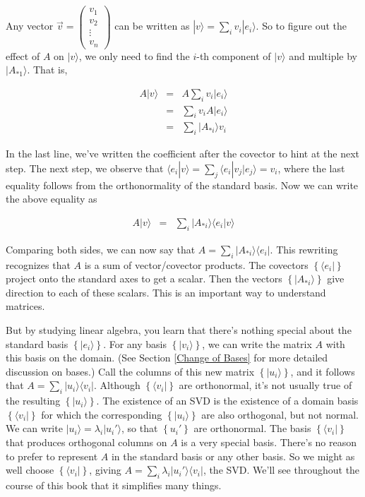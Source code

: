 \documentclass{amsbook}
\begin{document}
Any vector $\vec v=\begin{pmatrix} v_1  \\  v_2 \\ \vdots \\ v_n  \end{pmatrix}$ can be written as $|v\rangle = \sum_i v_i|e_i\rangle$.  So to figure out the effect of $A$ on $|v\rangle$, we only need to find the $i$-th component of $|v\rangle$ and multiple by $|A_{*1}\rangle$.  That is,

$$
\begin{array}{rcl}
A|v\rangle &=& A\sum_iv_i|e_i\rangle \\
 &=& \sum_iv_iA|e_i\rangle \\
 &=& \sum_i|A_{*i}\rangle v_i
\end{array}
$$

In the last line, we've written the coefficient after the covector to hint at the next step.  The next step, we observe that $\langle e_i|v\rangle=\sum_j\langle e_i|v_j|e_j\rangle = v_i$, where the last equality follows from the orthonormality of the standard basis.  Now we can write the above equality as

$$
\begin{array}{rcl}
A|v\rangle &=& \sum_i|A_{*i}\rangle\langle e_i|v\rangle
\end{array}
$$

Comparing both sides, we can now say that $A=\sum_i|A_{*i}\rangle\langle e_i|$.  This rewriting recognizes that $A$ is a sum of vector/covector products.  The covectors $\left\{\langle e_i|\right\}$ project onto the standard axes to get a scalar.  Then the vectors $\left\{|A_{*i}\rangle\right\}$ give direction to each of these scalars.  This is an important way to understand matrices.

But by studying linear algebra, you learn that there's nothing special about the standard basis $\left\{|e_i\rangle\right\}$.  For any basis $\left\{| v _i\rangle\right\}$, we can write the matrix $A$ with this basis on the domain.  (See Section \ref{Change of Bases} for more detailed discussion on bases.)  Call the columns of this new matrix $\left\{| u _i\rangle\right\}$, and it follows that $A=\sum_i| u _i\rangle\langle v _i|$.  Although $\left\{\langle v _i|\right\}$ are orthonormal, it's not usually true of the resulting $\left\{| u _i\rangle\right\}$.  The existence of an SVD is the existence of a domain basis $\left\{\langle v _i|\right\}$ for which the corresponding $\left\{| u _i\rangle\right\}$ are also orthogonal, but not normal.  We can write $|u_i\rangle=\lambda_i|u_i'\rangle$, so that $\left\{u_i'\right\}$ are orthonormal.  The basis $\left\{\langle v _i|\right\}$ that produces orthogonal columns on $A$ is a very special basis.  There's no reason to prefer to represent $A$ in the standard basis or any other basis.  So we might as well choose $\left\{\langle v _i|\right\}$, giving $A=\sum_i\lambda_i|u_i'\rangle\langle v_i|$, the SVD.  We'll see throughout the course of this book that it simplifies many things.
\end{document}
